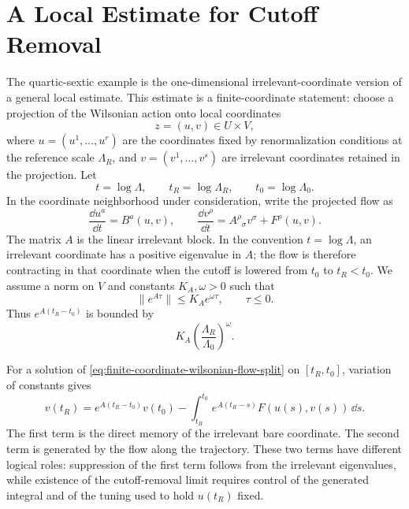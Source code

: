 \section{A Local Estimate for Cutoff Removal}

The quartic-sextic example is the one-dimensional irrelevant-coordinate
version of a general local estimate.  This estimate is a finite-coordinate
statement: choose a projection of the Wilsonian action onto local coordinates
\[
  z=(u,v)\in U\times V,
\]
where \(u=(u^1,\ldots,u^r)\) are the coordinates fixed by renormalization
conditions at the reference scale \(\Lambda_R\), and
\(v=(v^1,\ldots,v^s)\) are irrelevant coordinates retained in the projection.
Let
\[
  t=\log\Lambda,\qquad
  t_R=\log\Lambda_R,\qquad
  t_0=\log\Lambda_0 .
\]
In the coordinate neighborhood under consideration, write the projected flow
as
\begin{equation}
  \frac{\dd u^a}{\dd t}=B^a(u,v),
  \qquad
  \frac{\dd v^\rho}{\dd t}
  =
  A^\rho{}_\sigma v^\sigma+F^\rho(u,v).
  \label{eq:finite-coordinate-wilsonian-flow-split}
\end{equation}
The matrix \(A\) is the linear irrelevant block.  In the convention
\(t=\log\Lambda\), an irrelevant coordinate has a positive eigenvalue in
\(A\); the flow is therefore contracting in that coordinate when the cutoff
is lowered from \(t_0\) to \(t_R<t_0\).  We assume a norm on \(V\) and
constants \(K_A,\omega>0\) such that
\begin{equation}
  \|e^{A\tau}\|
  \leq
  K_A e^{\omega\tau},
  \qquad
  \tau\leq0 .
  \label{eq:irrelevant-backward-semigroup-bound}
\end{equation}
Thus \(e^{A(t_R-t_0)}\) is bounded by
\[
  K_A\left(\frac{\Lambda_R}{\Lambda_0}\right)^\omega .
\]

For a solution of \eqref{eq:finite-coordinate-wilsonian-flow-split} on
\([t_R,t_0]\), variation of constants gives
\begin{equation}
  v(t_R)
  =
  e^{A(t_R-t_0)}v(t_0)
  -
  \int_{t_R}^{t_0}
  e^{A(t_R-s)}F(u(s),v(s))\,\dd s .
  \label{eq:irrelevant-coordinate-variation-of-constants}
\end{equation}
The first term is the direct memory of the irrelevant bare coordinate.  The
second term is generated by the flow along the trajectory.  These two terms
have different logical roles: suppression of the first term follows from the
irrelevant eigenvalues, while existence of the cutoff-removal limit requires
control of the generated integral and of the tuning used to hold \(u(t_R)\)
fixed.

